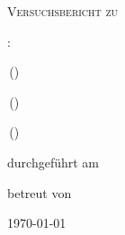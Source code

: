 
\makeatletter
\newcommand*{\protokollemailparse}[1]{%
	\@for\@tempa:=#1\do{%
		\normalsize\email{\@tempa}\\
	}%
}
\makeatother

\begin{titlepage}
	\centering
	{\scshape\LARGE Versuchsbericht zu \par}
	\vspace{1cm}
	{\scshape\huge \varNum {}: \varName\par}
	\vspace{2.5cm}
	{\LARGE \varGruppe\par}
	\vspace{0.5cm}
	{\large \varNameA \,(\email{\varEmailA}) \par}
	{\large \varNameB \,(\email{\varEmailB}) \par}
	{\large \varNameC \,(\email{\varEmailC}) \par}
	\vfill
	durchgeführt am {\large \varDatum}\par
	betreut von{\large \varBetreuer} 
	\vfill	
	{\large \today\par}
\end{titlepage}


\maketitle
